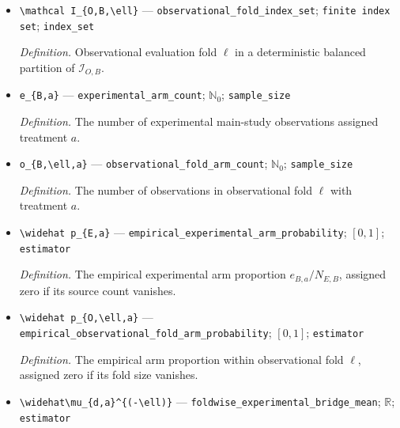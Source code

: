 \documentclass{article}
\begin{document}
\begin{itemize}
  \item \texttt{\textbackslash{}\allowbreak{}mathcal I\_\allowbreak{}\{O,\allowbreak{}B,\allowbreak{}\textbackslash{}\allowbreak{}ell\}\allowbreak{}} --- \texttt{observational\_\allowbreak{}fold\_\allowbreak{}index\_\allowbreak{}set}; \texttt{finite index set}; \texttt{index\_\allowbreak{}set}
  \par\smallskip\noindent\emph{Definition.} Observational evaluation fold \(\ell\) in a deterministic balanced partition of \(\mathcal I_{O,B}\).
  \item \texttt{e\_\allowbreak{}\{B,\allowbreak{}a\}\allowbreak{}} --- \texttt{experimental\_\allowbreak{}arm\_\allowbreak{}count}; \(\mathbb N_0\); \texttt{sample\_\allowbreak{}size}
  \par\smallskip\noindent\emph{Definition.} The number of experimental main-study observations assigned treatment \(a\).
  \item \texttt{o\_\allowbreak{}\{B,\allowbreak{}\textbackslash{}\allowbreak{}ell,\allowbreak{}a\}\allowbreak{}} --- \texttt{observational\_\allowbreak{}fold\_\allowbreak{}arm\_\allowbreak{}count}; \(\mathbb N_0\); \texttt{sample\_\allowbreak{}size}
  \par\smallskip\noindent\emph{Definition.} The number of observations in observational fold \(\ell\) with treatment \(a\).
  \item \texttt{\textbackslash{}\allowbreak{}widehat p\_\allowbreak{}\{E,\allowbreak{}a\}\allowbreak{}} --- \texttt{empirical\_\allowbreak{}experimental\_\allowbreak{}arm\_\allowbreak{}probability}; \([0,1]\); \texttt{estimator}
  \par\smallskip\noindent\emph{Definition.} The empirical experimental arm proportion \(e_{B,a}/N_{E,B}\), assigned zero if its source count vanishes.
  \item \texttt{\textbackslash{}\allowbreak{}widehat p\_\allowbreak{}\{O,\allowbreak{}\textbackslash{}\allowbreak{}ell,\allowbreak{}a\}\allowbreak{}} --- \texttt{empirical\_\allowbreak{}observational\_\allowbreak{}fold\_\allowbreak{}arm\_\allowbreak{}probability}; \([0,1]\); \texttt{estimator}
  \par\smallskip\noindent\emph{Definition.} The empirical arm proportion within observational fold \(\ell\), assigned zero if its fold size vanishes.
  \item \texttt{\textbackslash{}\allowbreak{}widehat\textbackslash{}\allowbreak{}mu\_\allowbreak{}\{d,\allowbreak{}a\}\allowbreak{}\textasciicircum{}\{(-\allowbreak{}\textbackslash{}\allowbreak{}ell)\}\allowbreak{}} --- \texttt{foldwise\_\allowbreak{}experimental\_\allowbreak{}bridge\_\allowbreak{}mean}; \(\mathbb R\); \texttt{estimator}

\end{itemize}
\end{document}
